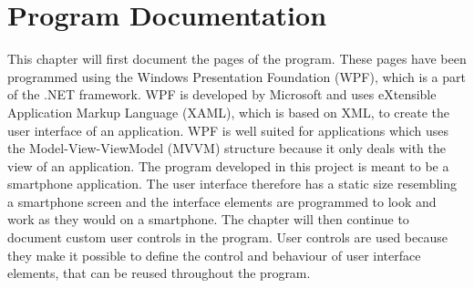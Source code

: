 \chapter{Program Documentation}
This chapter will first document the pages of the program. These pages have been programmed using the Windows Presentation Foundation (WPF), which is a part of the .NET framework. WPF is developed by Microsoft and uses eXtensible Application Markup Language (XAML), which is based on XML, to create the user interface of an application. WPF is well suited for applications which uses the Model-View-ViewModel (MVVM) structure because it only deals with the view of an application. The program developed in this project is meant to be a smartphone application. The user interface therefore has a static size resembling a smartphone screen and the interface elements are programmed to look and work as they would on a smartphone. The chapter will then continue to document custom user controls in the program. User controls are used because they make it possible to define the control and behaviour of user interface elements, that can be reused throughout the program.